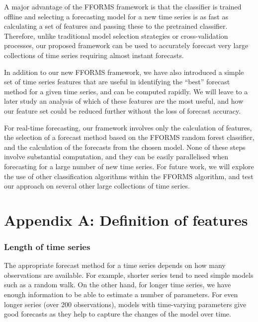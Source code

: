 \documentclass[11pt,a4paper,]{article}
\begin{document}
A major advantage of the FFORMS framework is that the classifier is trained offline and selecting a forecasting model for a new time series is as fast as calculating a set of features and passing these to the pretrained classifier. Therefore, unlike traditional model selection strategies or cross-validation processes, our proposed framework can be used to accurately forecast very large collections of time series requiring almost instant forecasts.

In addition to our new FFORMS framework, we have also introduced a simple set of time series features that are useful in identifying the ``best'' forecast method for a given time series, and can be computed rapidly. We will leave to a later study an analysis of which of these features are the most useful, and how our feature set could be reduced further without the loss of forecast accuracy.

For real-time forecasting, our framework involves only the calculation of features, the selection of a forecast method based on the FFORMS random forest classifier, and the calculation of the forecasts from the chosen model. None of these steps involve substantial computation, and they can be easily parallelised when forecasting for a large number of new time series. For future work, we will explore the use of other classification algorithms within the FFORMS algorithm, and test our approach on several other large collections of time series.

\hypertarget{appendix-a-definition-of-features}{%
\section*{Appendix A: Definition of features}\label{appendix-a-definition-of-features}}

\hypertarget{length-of-time-series}{%
\subsubsection*{Length of time series}\label{length-of-time-series}}

The appropriate forecast method for a time series depends on how many observations are available. For example, shorter series tend to need simple models such as a random walk. On the other hand, for longer time series, we have enough information to be able to estimate a number of parameters. For even longer series (over 200 observations), models with time-varying parameters give good forecasts as they help to capture the changes of the model over time.
\end{document}
